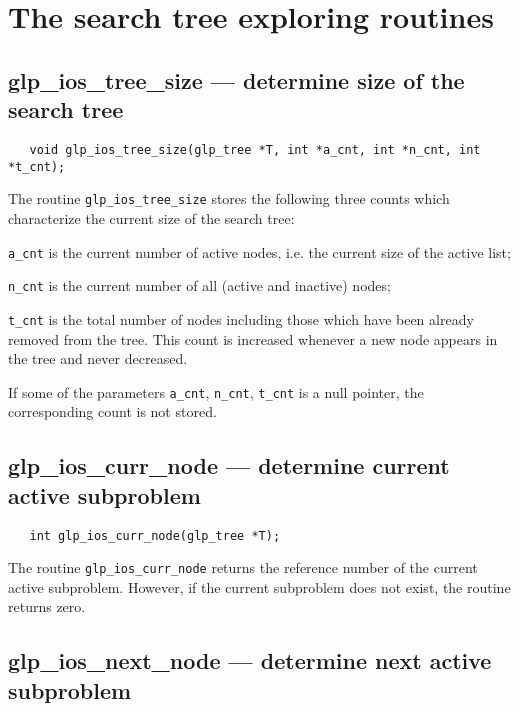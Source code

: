 \newpage

\section{The search tree exploring routines}

\subsection{glp\_ios\_tree\_size --- determine size of the search tree}

\synopsis

\begin{verbatim}
   void glp_ios_tree_size(glp_tree *T, int *a_cnt, int *n_cnt, int *t_cnt);
\end{verbatim}

\description

The routine \verb|glp_ios_tree_size| stores the following three counts
which characterize the current size of the search tree:

\verb|a_cnt| is the current number of active nodes, i.e. the current
size of the active list;

\verb|n_cnt| is the current number of all (active and inactive) nodes;

\verb|t_cnt| is the total number of nodes including those which have
been already removed from the tree. This count is increased whenever
a new node appears in the tree and never decreased.

If some of the parameters \verb|a_cnt|, \verb|n_cnt|, \verb|t_cnt| is
a null pointer, the corresponding count is not stored.

\subsection{glp\_ios\_curr\_node --- determine current active
subproblem}

\synopsis

\begin{verbatim}
   int glp_ios_curr_node(glp_tree *T);
\end{verbatim}

\returns

The routine \verb|glp_ios_curr_node| returns the reference number of
the current active subproblem. However, if the current subproblem does
not exist, the routine returns zero.

\subsection{glp\_ios\_next\_node --- determine next active subproblem}

